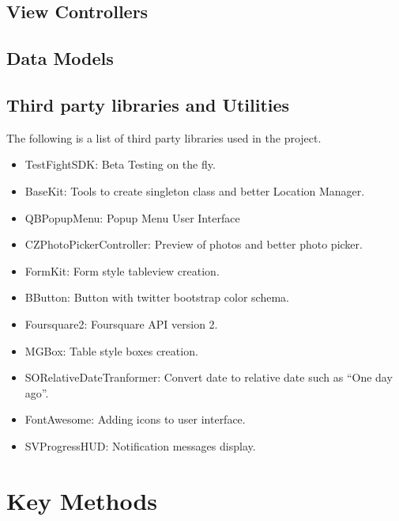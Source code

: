 \subsection{View Controllers} %
\label{sub:view_controllers}

 	 
\subsection{Data Models} %
\label{sub:models}


\subsection{Third party libraries and Utilities} %
\label{sub:third_party_and_utilities}
The following is a list of third party libraries used in the project.
		\begin{itemize}
		    \item TestFightSDK: Beta Testing on the fly.
		    \item BaseKit: Tools to create singleton class and better Location Manager.
			\item QBPopupMenu: Popup Menu User Interface
			\item CZPhotoPickerController: Preview of photos and better photo picker.
			\item FormKit: Form style tableview creation.
			\item BButton: Button with twitter bootstrap color schema.
			\item Foursquare2: Foursquare API version 2.
			\item MGBox: Table style boxes creation.
			\item SORelativeDateTranformer: Convert date to relative date such as ``One day ago''.
			\item FontAwesome: Adding icons to user interface.
			\item SVProgressHUD: Notification messages display.
		 \end{itemize}


\section{Key Methods} %
\label{sec:main_methods}

